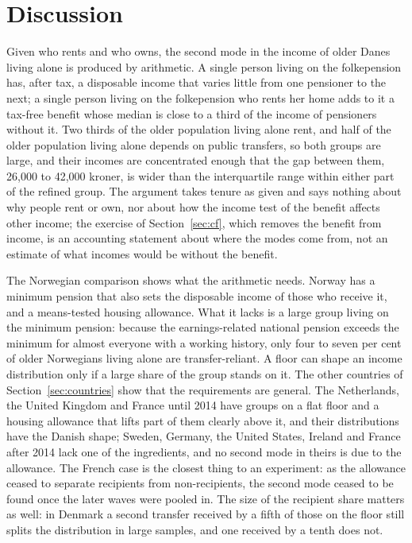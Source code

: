 \section{Discussion}\label{sec:disc}

Given who rents and who owns, the second mode in the income of older Danes living alone is produced by arithmetic. A single person living on the folkepension has, after tax, a disposable income that varies little from one pensioner to the next; a single person living on the folkepension who rents her home adds to it a tax-free benefit whose median is close to a third of the income of pensioners without it. Two thirds of the older population living alone rent, and half of the older population living alone depends on public transfers, so both groups are large, and their incomes are concentrated enough that the gap between them, 26{,}000 to 42{,}000 kroner, is wider than the interquartile range within either part of the refined group. The argument takes tenure as given and says nothing about why people rent or own, nor about how the income test of the benefit affects other income; the exercise of Section~\ref{sec:cf}, which removes the benefit from income, is an accounting statement about where the modes come from, not an estimate of what incomes would be without the benefit.

The Norwegian comparison shows what the arithmetic needs. Norway has a minimum pension that also sets the disposable income of those who receive it, and a means-tested housing allowance. What it lacks is a large group living on the minimum pension: because the earnings-related national pension exceeds the minimum for almost everyone with a working history, only four to seven per cent of older Norwegians living alone are transfer-reliant. A floor can shape an income distribution only if a large share of the group stands on it. The other countries of Section~\ref{sec:countries} show that the requirements are general. The Netherlands, the United Kingdom and France until 2014 have groups on a flat floor and a housing allowance that lifts part of them clearly above it, and their distributions have the Danish shape; Sweden, Germany, the United States, Ireland and France after 2014 lack one of the ingredients, and no second mode in theirs is due to the allowance. The French case is the closest thing to an experiment: as the allowance ceased to separate recipients from non-recipients, the second mode ceased to be found once the later waves were pooled in. The size of the recipient share matters as well: in Denmark a second transfer received by a fifth of those on the floor still splits the distribution in large samples, and one received by a tenth does not.


